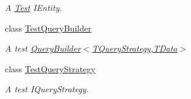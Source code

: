 \begin{DoxyCompactItemize}
\begin{DoxyCompactList}\small\item\em A \hyperlink{namespaceCqrs_1_1Azure_1_1BlobStorage_1_1Test}{Test} I\+Entity. \end{DoxyCompactList}\item 
class \hyperlink{classCqrs_1_1Azure_1_1BlobStorage_1_1Test_1_1Integration_1_1TestQueryBuilder}{Test\+Query\+Builder}
\begin{DoxyCompactList}\small\item\em A test \hyperlink{classCqrs_1_1Repositories_1_1Queries_1_1QueryBuilder_a8a7b6495f78adedc7b7a82d2c83f17d5_a8a7b6495f78adedc7b7a82d2c83f17d5}{Query\+Builder$<$\+T\+Query\+Strategy,\+T\+Data$>$} \end{DoxyCompactList}\item 
class \hyperlink{classCqrs_1_1Azure_1_1BlobStorage_1_1Test_1_1Integration_1_1TestQueryStrategy}{Test\+Query\+Strategy}
\begin{DoxyCompactList}\small\item\em A test I\+Query\+Strategy. \end{DoxyCompactList}\end{DoxyCompactItemize}
